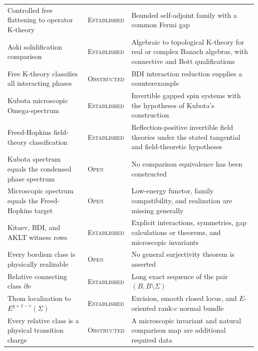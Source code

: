 \documentclass[12pt]{article}
\theoremstyle{definition}
\theoremstyle{remark}
\newcommand{\EST}{\textnormal{\textsc{Established}}}
\newcommand{\OPEN}{\textnormal{\textsc{Open}}}
\newcommand{\OBST}{\textnormal{\textsc{Obstructed}}}
\begin{document}
\begin{longtable}{>{\raggedright\arraybackslash}p{}
                  >{\raggedright\arraybackslash}p{}
                  >{\raggedright\arraybackslash}p{}}
Controlled free flattening to operator K-theory
& \EST{}
& Bounded self-adjoint family with a common Fermi gap \\

Aoki solidification comparison
& \EST{}
& Algebraic to topological K-theory for real or complex Banach algebras, with connective and Bott qualifications \\

Free K-theory classifies all interacting phases
& \OBST{}
& BDI interaction reduction supplies a counterexample \\

Kubota microscopic Omega-spectrum
& \EST{}
& Invertible gapped spin systems with the hypotheses of Kubota's construction \\

Freed-Hopkins field-theory classification
& \EST{}
& Reflection-positive invertible field theories under the stated tangential and field-theoretic hypotheses \\

Kubota spectrum equals the condensed phase spectrum
& \OPEN{}
& No comparison equivalence has been constructed \\

Microscopic spectrum equals the Freed-Hopkins target
& \OPEN{}
& Low-energy functor, family compatibility, and realization are missing generally \\

Kitaev, BDI, and AKLT witness rows
& \EST{}
& Explicit interactions, symmetries, gap calculations or theorems, and microscopic invariants \\

Every bordism class is physically realizable
& \OPEN{}
& No general surjectivity theorem is asserted \\

Relative connecting class $\partial\nu$
& \EST{}
& Long exact sequence of the pair $(B,B\setminus\Sigma)$ \\

Thom localization to $E^{q+1-c}(\Sigma)$
& \EST{}
& Excision, smooth closed locus, and $E$-oriented rank-$c$ normal bundle \\

Every relative class is a physical transition charge
& \OBST{}
& A microscopic invariant and natural comparison map are additional required data \\
\bottomrule
\end{longtable}
\end{document}
